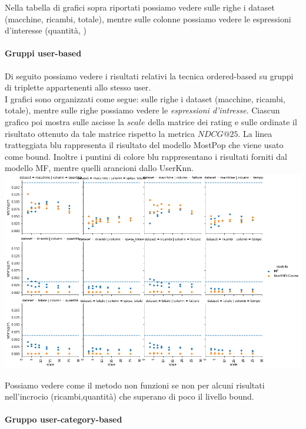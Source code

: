 Nella tabella di grafici sopra riportati possiamo vedere sulle righe i dataset (macchine, ricambi, totale), mentre sulle colonne possiamo vedere le espressioni d'interesse (quantità, )

\paragraph{Gruppi user-based}
Di seguito possiamo vedere i risultati relativi la tecnica ordered-based su gruppi di triplette appartenenti allo stesso user.\\
I grafici sono organizzati come segue: sulle righe i dataset (macchine, ricambi, totale), mentre sulle righe possiamo vedere le \textit{espressioni d'intresse}. Ciascun grafico poi mostra sulle ascisse la $scale$ della matrice dei rating e sulle ordinate il risultato ottenuto da tale matrice rispetto la metrica $NDCG@25$. La linea tratteggiata blu rappresenta il risultato del modello MostPop che viene usato come bound.
Inoltre i puntini di colore blu rappresentano i risultati forniti dal modello MF, mentre quelli arancioni dallo UserKnn.\\

\includegraphics[width=16cm]{figures/risultati_ordered_singolo.png}

Possiamo vedere come il metodo non funzioni se non per alcuni risultati nell'incrocio (ricambi,quantità) che superano di poco il livello bound.

\paragraph{Gruppo user-category-based}

